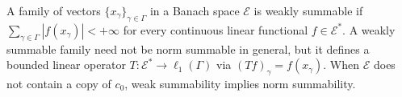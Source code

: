 A family of vectors $\{x_\gamma\}_{\gamma \in \Gamma}$ in a Banach space $\mathcal{E}$ is weakly summable if $\sum_{\gamma \in \Gamma} |f(x_\gamma)| < +\infty$ for every continuous linear functional $f \in \mathcal{E}^*$. A weakly summable family need not be norm summable in general, but it defines a bounded linear operator $T: \mathcal{E}^* \to \ell_1(\Gamma)$ via $(Tf)_\gamma = f(x_\gamma)$. When $\mathcal{E}$ does not contain a copy of $c_0$, weak summability implies norm summability.
